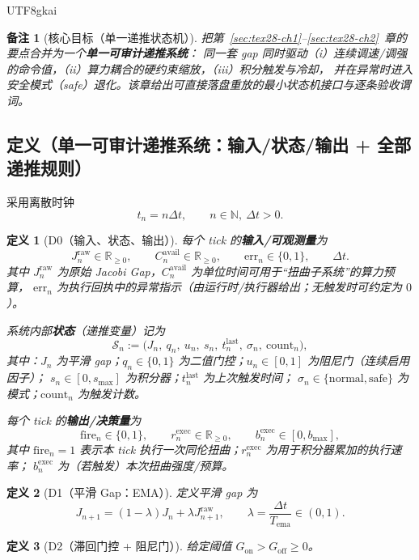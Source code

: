 \documentclass[12pt]{article}
\newtheorem{definition}{定义}[section]
\newtheorem{remark}{备注}[section]
\newcommand{\RR}{\mathbb{R}}
\newcommand{\NN}{\mathbb{N}}
\begin{document}
\begin{CJK*}{UTF8}{gkai}
\begin{remark}[核心目标（单一递推状态机）]
把第~\ref{sec:tex28-ch1}--\ref{sec:tex28-ch2}~章的要点合并为一个\textbf{单一可审计递推系统}：
同一套 gap 同时驱动（i）连续调速/调强的命令值，（ii）算力耦合的硬约束缩放，（iii）积分触发与冷却，
并在异常时进入安全模式（safe）退化。该章给出可直接落盘重放的最小状态机接口与逐条验收谓词。
\end{remark}

\subsection{定义（单一可审计递推系统：输入/状态/输出 + 全部递推规则）}
\label{subsec:tex28-ch3-defs}
采用离散时钟
\[
  t_n=n\Delta t,\qquad n\in\NN,\ \Delta t>0.
\]

\begin{definition}[D0（输入、状态、输出）]
\label{def:tex28-ch3-d0}
每个 tick 的\textbf{输入/可观测量}为
\[
  J^{\mathrm{raw}}_{n}\in\RR_{\ge 0},
  \qquad
  C^{\mathrm{avail}}_{n}\in\RR_{\ge 0},
  \qquad
  \mathrm{err}_{n}\in\{0,1\},
  \qquad
  \Delta t.
\]
其中 $J^{\mathrm{raw}}_n$ 为原始 Jacobi Gap，$C^{\mathrm{avail}}_n$ 为单位时间可用于“扭曲子系统”的算力预算，
$\mathrm{err}_n$ 为执行回执中的异常指示（由运行时/执行器给出；无触发时可约定为 $0$）。

系统内部\textbf{状态}（递推变量）记为
\[
  \mathcal{S}_n := \bigl(J_n,\ q_n,\ u_n,\ s_n,\ t^{\mathrm{last}}_n,\ \sigma_n,\ \mathrm{count}_n\bigr),
\]
其中：$J_n$ 为平滑 gap；$q_n\in\{0,1\}$ 为二值门控；$u_n\in[0,1]$ 为阻尼门（连续启用因子）；
$s_n\in[0,s_{\max}]$ 为积分器；$t^{\mathrm{last}}_n$ 为上次触发时间；
$\sigma_n\in\{\mathrm{normal},\mathrm{safe}\}$ 为模式；$\mathrm{count}_n$ 为触发计数。

每个 tick 的\textbf{输出/决策量}为
\[
  \mathrm{fire}_n\in\{0,1\},
  \qquad
  r^{\mathrm{exec}}_n\in\RR_{\ge 0},
  \qquad
  b^{\mathrm{exec}}_n\in[0,b_{\max}],
\]
其中 $\mathrm{fire}_n=1$ 表示本 tick 执行一次同伦扭曲；$r^{\mathrm{exec}}_n$ 为用于积分器累加的执行速率；
$b^{\mathrm{exec}}_n$ 为（若触发）本次扭曲强度/预算。
\end{definition}

\begin{definition}[D1（平滑 Gap：EMA）]
\label{def:tex28-ch3-d1}
定义平滑 gap 为
\[
  J_{n+1}=(1-\lambda)J_n+\lambda J^{\mathrm{raw}}_{n+1},
  \qquad
  \lambda=\frac{\Delta t}{T_{\mathrm{ema}}}\in(0,1).
\]
\end{definition}

\begin{definition}[D2（滞回门控 + 阻尼门）]
\label{def:tex28-ch3-d2}
给定阈值 $G_{\mathrm{on}}>G_{\mathrm{off}}\ge 0$。


\end{definition}
\end{CJK*}
\end{document}
